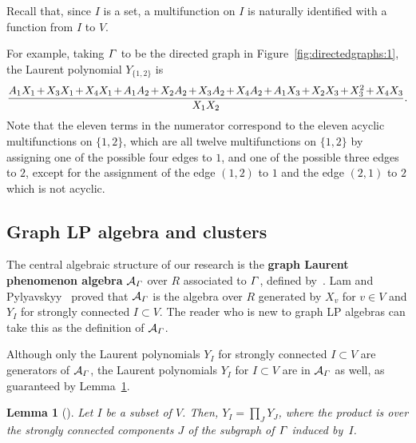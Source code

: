 \documentclass[11pt]{article}
\newtheorem{lemm}[theo]{Lemma}
\theoremstyle{definition}
\numberwithin{equation}{section}
\newcommand{\vocab}[1]{\textbf{#1}}
\newcommand{\vertices}{V}
\newcommand{\coefficientring}{R}
\newcommand{\graphLPalgebra}[1]{\mathcal{A}_{#1}}
\begin{document}
Recall that, since \(I\) is a set, a multifunction on \(I\) is naturally identified with a function from \(I\) to \(\vertices\).

For example,
taking \(\varGamma\) to be the directed graph in Figure~\ref{fig:directedgraphs:1},
the Laurent polynomial \(Y_{\{1, 2\}}\) is
\begin{equation*}
    \medmuskip=2mu
    \frac{
        A_1X_1 + X_3X_1 + X_4X_1 +
        A_1A_2 + X_2A_2 + X_3A_2 + X_4A_2 +
        A_1X_3 + X_2X_3 + X_3^2  + X_4X_3
    }{X_1X_2}.
\end{equation*}
Note that the eleven terms in the numerator correspond to the eleven acyclic multifunctions on \(\{1, 2\}\),
which are all twelve multifunctions on \(\{1, 2\}\) by assigning one of the possible four edges to \(1\),
and one of the possible three edges to \(2\),
except for the assignment of the edge \((1, 2)\) to \(1\) and the edge \((2, 1)\) to \(2\) which is not acyclic.

\subsection{Graph LP algebra and clusters} \label{subsection:graphLPalgebraandclusters}

The central algebraic structure of our research is the \vocab{graph Laurent phenomenon algebra} \(\graphLPalgebra{\graph}\) over \(\coefficientring\) associated to \(\varGamma\), defined by~\cite{linearLP}.
Lam and Pylyavskyy~\cite{linearLP} proved that \(\graphLPalgebra{\graph}\) is the algebra over \(\coefficientring\) generated by 
\(X_v\) for \(v \in \vertices\) and \(Y_I\) for strongly connected \(I \subset \vertices\).
The reader who is new to graph LP algebras can take this as the definition of \(\graphLPalgebra{\graph}\).

Although only the Laurent polynomials \(Y_I\) for strongly connected \(I \subset \vertices\) are generators of \(\graphLPalgebra{\graph}\),
the Laurent polynomials \(Y_I\) for \(I \subset \vertices\) are in \(\graphLPalgebra{\graph}\) as well, as guaranteed by Lemma~\ref{lemma:y:product}.

\begin{lemm}[{\cite[Lemma 4.2]{linearLP}}] \label{lemma:y:product}
    Let \(I\) be a subset of \(\vertices\).
    Then, \(Y_I = \prod_{J} Y_J\), where the product is over the strongly connected components \(J\) of the subgraph of \(\varGamma\) induced by~\(I\).
\end{lemm}
\end{document}

